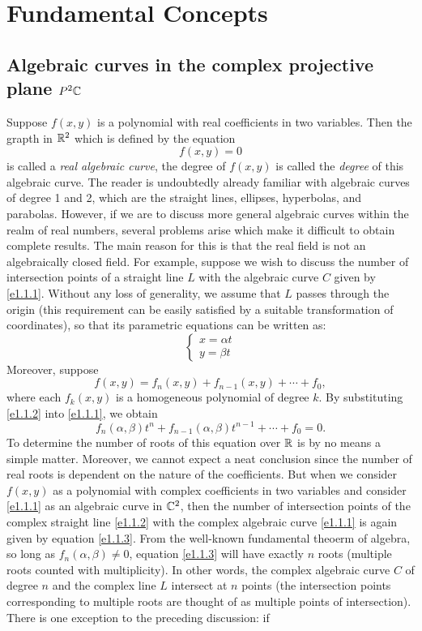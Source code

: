 \chapter{Fundamental Concepts}\label{c1}
\section{Algebraic curves in the complex projective plane \texorpdfstring{$P^2\mathbb{C}$}{P2C}}\label{s1.1}
Suppose $f(x,y)$ is a polynomial with real coefficients in two variables. Then the grapth in $\mathbb{R}^2$ which is defined by the equation 
\begin{equation}\label{e1.1.1}
    f(x,y)=0
\end{equation}
is called a \textit{real algebraic curve}, the degree of $f(x,y)$ is called the \textit{degree} of this algebraic curve. The reader is undoubtedly already familiar with algebraic curves of degree 1 and 2, which are the straight lines, ellipses, hyperbolas, and parabolas. However, if we are to discuss more general algebraic curves within the realm of real numbers, several problems arise which make it difficult to obtain complete results. The main reason for this is that the real field is not an algebraically closed field. For example, suppose we wish to discuss the number of intersection points of a straight line $L$ with the algebraic curve $C$ given by \eqref{e1.1.1}. Without any loss of generality, we assume that $L$ passes through the origin (this requirement can be easily satisfied by a suitable transformation of coordinates), so that its parametric equations can be written as: 
\begin{equation}\label{e1.1.2}
    \begin{cases}
        x=\alpha t\\
        y=\beta t
    \end{cases}
\end{equation}
Moreover, suppose 
$$f(x,y)=f_n(x,y)+f_{n-1}(x,y)+\cdots+f_0, $$
where each $f_k(x,y)$ is a homogeneous polynomial of degree $k$. By substituting \eqref{e1.1.2} into \eqref{e1.1.1}, we obtain 
\begin{equation}\label{e1.1.3}
    f_n(\alpha,\beta)t^n+f_{n-1}(\alpha,\beta)t^{n-1}+\cdots+f_0=0. 
\end{equation}
To determine the number of roots of this equation over $\mathbb{R}$ is by no means a simple matter. Moreover, we cannot expect a neat conclusion since the number of real roots is dependent on the nature of the coefficients. But when we consider $f(x,y)$ as a polynomial with complex coefficients in two variables and consider \eqref{e1.1.1} as an algebraic curve in $\mathbb{C}^2$, then the number of intersection points of the complex straight line \eqref{e1.1.2} with the complex algebraic curve \eqref{e1.1.1} is again given by equation \eqref{e1.1.3}. From the well-known fundamental theoerm of algebra, so long as $f_n(\alpha,\beta)\neq0$, equation \eqref{e1.1.3} will have exactly $n$ roots (multiple roots counted with multiplicity). In other words, the complex algebraic curve $C$ of degree $n$ and the complex line $L$ intersect at $n$ points (the intersection points corresponding to multiple roots are thought of as multiple points of intersection). There is one exception to the preceding discussion: if 

